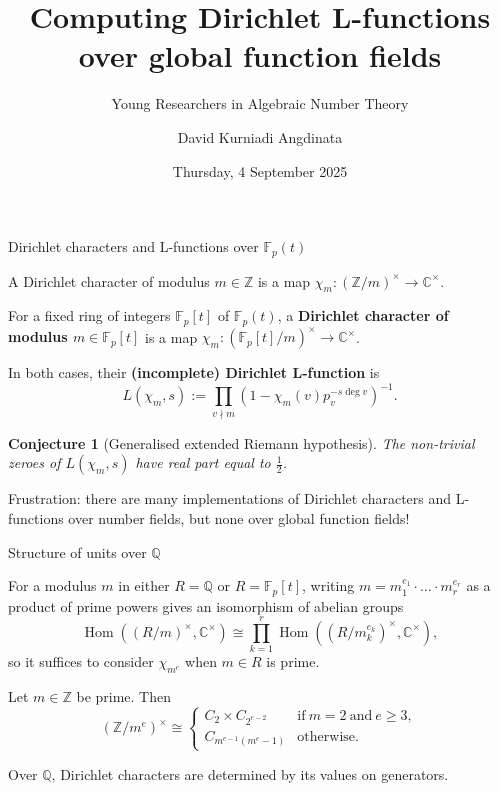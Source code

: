 \documentclass[10pt]{beamer}
\title{Computing Dirichlet L-functions over global function fields}
\subtitle{Young Researchers in Algebraic Number Theory}
\author{David Kurniadi Angdinata}
\institute{London School of Geometry and Number Theory}
\date{Thursday, 4 September 2025}
\newtheorem{conjecture}{Conjecture}
\begin{document}
\frame{\titlepage}

\begin{frame}[t]{Dirichlet characters and L-functions over $ \mathbb{F}_p(t) $}

A Dirichlet character of modulus $ m \in \mathbb{Z} $ is a map $ \chi_m : (\mathbb{Z} / m)^\times \to \mathbb{C}^\times $.

\vspace{0.5cm} For a fixed ring of integers $ \mathbb{F}_p[t] $ of $ \mathbb{F}_p(t) $, a \textbf{Dirichlet character of modulus $ m \in \mathbb{F}_p[t] $} is a map $ \chi_m : (\mathbb{F}_p[t] / m)^\times \to \mathbb{C}^\times $.

\vspace{0.5cm} In both cases, their \textbf{(incomplete) Dirichlet L-function} is
$$ L(\chi_m, s) := \prod_{v \nmid m} (1 - \chi_m(v)p_v^{-s\deg v})^{-1}. $$

\begin{conjecture}[Generalised extended Riemann hypothesis]
The non-trivial zeroes of $ L(\chi_m, s) $ have real part equal to $ \tfrac{1}{2} $.
\end{conjecture}

\vspace{0.5cm} Frustration: there are many implementations of Dirichlet characters and L-functions over number fields, but none over global function fields!

\end{frame}

\begin{frame}[t]{Structure of units over $ \mathbb{Q} $}

For a modulus $ m $ in either $ R = \mathbb{Q} $ or $ R = \mathbb{F}_p[t] $, writing $ m = m_1^{e_1} \cdot \dots \cdot m_r^{e_r} $ as a product of prime powers gives an isomorphism of abelian groups
$$ \operatorname{Hom}((R / m)^\times, \mathbb{C}^\times) \cong \prod_{k = 1}^r \operatorname{Hom}((R / m_k^{e_k})^\times, \mathbb{C}^\times), $$
so it suffices to consider $ \chi_{m^e} $ when $ m \in R $ is prime.

\vspace{0.5cm}

\begin{lemma}
Let $ m \in \mathbb{Z} $ be prime. Then
$$ (\mathbb{Z} / m^e)^\times \cong
\begin{cases}
C_2 \times C_{2^{e - 2}} & \text{if} \ m = 2 \ \text{and} \ e \ge 3, \\
C_{m^{e - 1}(m^e - 1)} & \text{otherwise}.
\end{cases}
$$
\end{lemma}

Over $ \mathbb{Q} $, Dirichlet characters are determined by its values on generators.

\end{frame}
\end{document}
